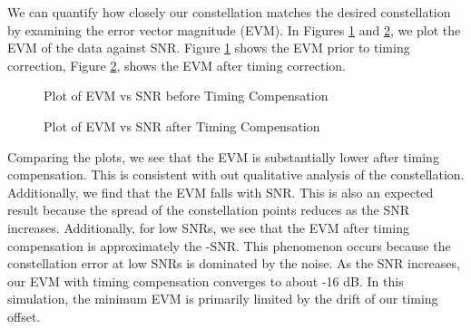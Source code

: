 \documentclass{article}
\begin{document}
We can quantify how closely our constellation matches the desired constellation by examining the error vector magnitude (EVM). In Figures \ref{fig::evm_vs_snr_no_correction} and \ref{fig::evm_vs_snr}, we plot the EVM of the data against SNR. Figure \ref{fig::evm_vs_snr_no_correction} shows the EVM prior to timing correction, Figure \ref{fig::evm_vs_snr}, shows the EVM after timing correction. 

\begin{figure}[H]
	\centerline{}
	\caption{Plot of EVM vs SNR before Timing Compensation}
	\label{fig::evm_vs_snr_no_correction}
\end{figure}

\begin{figure}[H]
	\centerline{}
	\caption{Plot of EVM vs SNR after Timing Compensation}
	\label{fig::evm_vs_snr}
\end{figure}

Comparing the plots, we see that the EVM is substantially lower after timing compensation. This is consistent with out qualitative analysis of the constellation. Additionally, we find that the EVM falls with SNR. This is also an expected result because the spread of the constellation points reduces as the SNR increases. Additionally, for low SNRs, we see that the EVM after timing compensation is approximately the -SNR. This phenomenon occurs because the constellation error at low SNRs is dominated by the noise. As the SNR increases, our EVM with timing compensation converges to about -16 dB. In this simulation, the minimum EVM is primarily limited by the drift of our timing offset.
\end{document}
